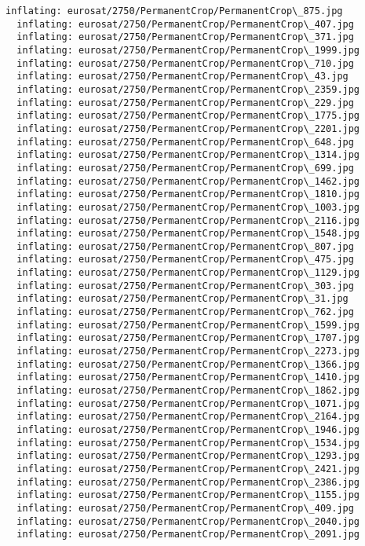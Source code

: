 \documentclass[11pt]{article}
\begin{document}
\begin{Verbatim}[commandchars=\\\{\}]
  inflating: eurosat/2750/PermanentCrop/PermanentCrop\_875.jpg
  inflating: eurosat/2750/PermanentCrop/PermanentCrop\_407.jpg
  inflating: eurosat/2750/PermanentCrop/PermanentCrop\_371.jpg
  inflating: eurosat/2750/PermanentCrop/PermanentCrop\_1999.jpg
  inflating: eurosat/2750/PermanentCrop/PermanentCrop\_710.jpg
  inflating: eurosat/2750/PermanentCrop/PermanentCrop\_43.jpg
  inflating: eurosat/2750/PermanentCrop/PermanentCrop\_2359.jpg
  inflating: eurosat/2750/PermanentCrop/PermanentCrop\_229.jpg
  inflating: eurosat/2750/PermanentCrop/PermanentCrop\_1775.jpg
  inflating: eurosat/2750/PermanentCrop/PermanentCrop\_2201.jpg
  inflating: eurosat/2750/PermanentCrop/PermanentCrop\_648.jpg
  inflating: eurosat/2750/PermanentCrop/PermanentCrop\_1314.jpg
  inflating: eurosat/2750/PermanentCrop/PermanentCrop\_699.jpg
  inflating: eurosat/2750/PermanentCrop/PermanentCrop\_1462.jpg
  inflating: eurosat/2750/PermanentCrop/PermanentCrop\_1810.jpg
  inflating: eurosat/2750/PermanentCrop/PermanentCrop\_1003.jpg
  inflating: eurosat/2750/PermanentCrop/PermanentCrop\_2116.jpg
  inflating: eurosat/2750/PermanentCrop/PermanentCrop\_1548.jpg
  inflating: eurosat/2750/PermanentCrop/PermanentCrop\_807.jpg
  inflating: eurosat/2750/PermanentCrop/PermanentCrop\_475.jpg
  inflating: eurosat/2750/PermanentCrop/PermanentCrop\_1129.jpg
  inflating: eurosat/2750/PermanentCrop/PermanentCrop\_303.jpg
  inflating: eurosat/2750/PermanentCrop/PermanentCrop\_31.jpg
  inflating: eurosat/2750/PermanentCrop/PermanentCrop\_762.jpg
  inflating: eurosat/2750/PermanentCrop/PermanentCrop\_1599.jpg
  inflating: eurosat/2750/PermanentCrop/PermanentCrop\_1707.jpg
  inflating: eurosat/2750/PermanentCrop/PermanentCrop\_2273.jpg
  inflating: eurosat/2750/PermanentCrop/PermanentCrop\_1366.jpg
  inflating: eurosat/2750/PermanentCrop/PermanentCrop\_1410.jpg
  inflating: eurosat/2750/PermanentCrop/PermanentCrop\_1862.jpg
  inflating: eurosat/2750/PermanentCrop/PermanentCrop\_1071.jpg
  inflating: eurosat/2750/PermanentCrop/PermanentCrop\_2164.jpg
  inflating: eurosat/2750/PermanentCrop/PermanentCrop\_1946.jpg
  inflating: eurosat/2750/PermanentCrop/PermanentCrop\_1534.jpg
  inflating: eurosat/2750/PermanentCrop/PermanentCrop\_1293.jpg
  inflating: eurosat/2750/PermanentCrop/PermanentCrop\_2421.jpg
  inflating: eurosat/2750/PermanentCrop/PermanentCrop\_2386.jpg
  inflating: eurosat/2750/PermanentCrop/PermanentCrop\_1155.jpg
  inflating: eurosat/2750/PermanentCrop/PermanentCrop\_409.jpg
  inflating: eurosat/2750/PermanentCrop/PermanentCrop\_2040.jpg
  inflating: eurosat/2750/PermanentCrop/PermanentCrop\_2091.jpg

\end{Verbatim}
\end{document}
